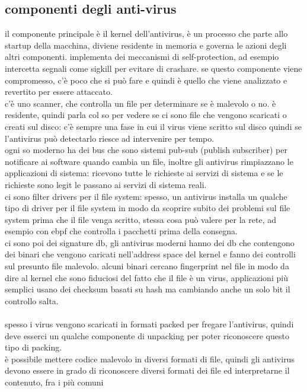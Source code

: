 \documentclass[12pt, oneside]{extbook} %
\begin{document}
\subsection{componenti degli anti-virus}
il componente principale è il kernel dell'antivirus, è un processo che parte allo startup della macchina, diviene residente in memoria e governa le azioni degli altri componenti. implementa dei meccanismi di self-protection, ad esempio intercetta segnali come sigkill per evitare di crashare. se questo componente viene compromesso, c'è poco che si può fare e quindi è quello che viene analizzato e revertito per essere attaccato.\\c'è uno scanner, che controlla un file per determinare se è malevolo o no. è residente, quindi parla col so per vedere se ci sono file che vengono scaricati o creati sul disco: c'è sempre una fase in cui il virus viene scritto sul disco quindi se l'antivirus può detectarlo riesce ad intervenire per tempo.\\ogni so moderno ha dei bus che sono sistemi pub-sub (publish subscriber) per notificare ai software quando cambia un file, inoltre gli antivirus rimpiazzano le applicazioni di sistema: ricevono tutte le richieste ai servizi di sistema e se le richieste sono legit le passano ai servizi di sistema reali.\\ci sono filter drivers per il file system: spesso, un antivirus installa un qualche tipo di driver per il file system in modo da scoprire subito dei problemi sul file system prima che il file venga scritto, stessa cosa può valere per la rete, ad esempio con ebpf che controlla i pacchetti prima della consegna.\\ci sono poi dei signature db, gli antivirus moderni hanno dei db che contengono dei binari che vengono caricati nell'address space del kernel e fanno dei controlli sul presunto file malevolo. alcuni binari cercano fingerprint nel file in modo da dire al kernel che sono fiduciosi del fatto che il file è un virus, applicazioni più semplici usano dei checksum basati su hash ma cambiando anche un solo bit il controllo salta.\\\\spesso i virus vengono scaricati in formati packed per fregare l'antivirus, quindi deve esserci un qualche componente di unpacking per poter riconoscere questo tipo di packing.\\è possibile mettere codice malevolo in diversi formati di file, quindi gli antivirus devono essere in grado di riconoscere diversi formati dei file ed interpretarne il contenuto, fra i più comuni
\end{document}

